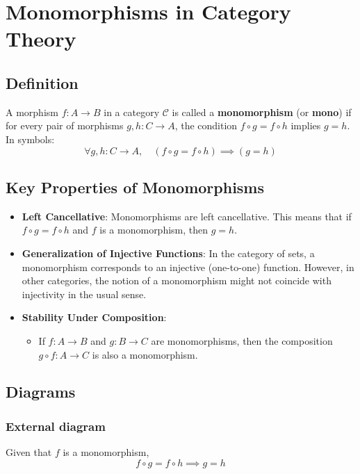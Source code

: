 \documentclass{article}
\begin{document}
\section*{Monomorphisms in Category Theory}

\subsection*{Definition}
A morphism $f : A \rightarrow B$ in a category $\mathcal{C}$ is called a \textbf{monomorphism} (or \textbf{mono}) if for every pair of morphisms $g, h : C \rightarrow A$, the condition $f \circ g = f \circ h$ implies $g = h$.
\newline
In symbols:
\begin{equation*}
\forall g, h : C \rightarrow A, \quad (f \circ g = f \circ h) \implies (g = h)
\end{equation*}

\subsection*{Key Properties of Monomorphisms}
\begin{itemize}
    \item \textbf{Left Cancellative}: Monomorphisms are left cancellative. This means that if $f \circ g = f \circ h$ and $f$ is a monomorphism, then $g = h$.
    \item \textbf{Generalization of Injective Functions}: In the category of sets, a monomorphism corresponds to an injective (one-to-one) function. However, in other categories, the notion of a monomorphism might not coincide with injectivity in the usual sense.
    \item \textbf{Stability Under Composition}:
    \begin{itemize}
        \item If $f : A \rightarrow B$ and $g : B \rightarrow C$ are monomorphisms, then the composition $g \circ f : A \rightarrow C$ is also a monomorphism.
    \end{itemize}
\end{itemize}

\subsection*{Diagrams}
\subsubsection{External diagram}
Given that $f$ is a monomorphism,
\begin{equation*}
    f \circ g = f \circ h \implies g = h
\end{equation*}
\end{document}
